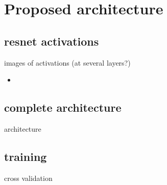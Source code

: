 \section{Proposed architecture}

\subsection{resnet activations}

images of activations (at several layers?)

\begin{itemize}
	\item \url{}
\end{itemize}

\subsection{complete architecture}

architecture

\subsection{training}

cross validation
